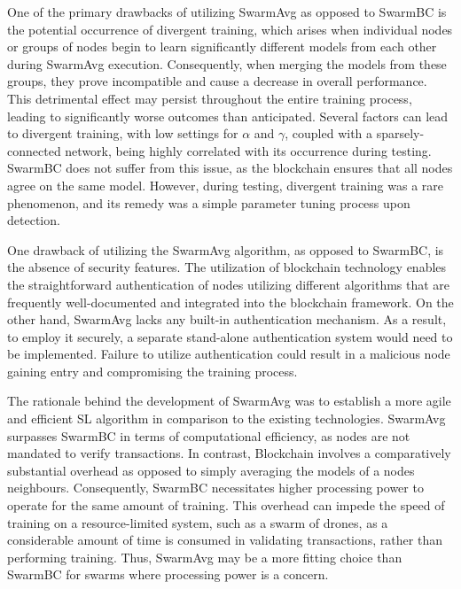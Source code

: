 One of the primary drawbacks of utilizing SwarmAvg as opposed to SwarmBC is the potential occurrence of divergent training, which arises when individual nodes or groups of nodes begin to learn significantly different models from each other during SwarmAvg execution. Consequently, when merging the models from these groups, they prove incompatible and cause a decrease in overall performance. This detrimental effect may persist throughout the entire training process, leading to significantly worse outcomes than anticipated. Several factors can lead to divergent training, with low settings for $\alpha$ and $\gamma$, coupled with a sparsely-connected network, being highly correlated with its occurrence during testing. SwarmBC does not suffer from this issue, as the blockchain ensures that all nodes agree on the same model. However, during testing, divergent training was a rare phenomenon, and its remedy was a simple parameter tuning process upon detection.

One drawback of utilizing the SwarmAvg algorithm, as opposed to SwarmBC, is the absence of security features. The utilization of blockchain technology enables the straightforward authentication of nodes utilizing different algorithms that are frequently well-documented and integrated into the blockchain framework. On the other hand, SwarmAvg lacks any built-in authentication mechanism. As a result, to employ it securely, a separate stand-alone authentication system would need to be implemented. Failure to utilize authentication could result in a malicious node gaining entry and compromising the training process.

The rationale behind the development of SwarmAvg was to establish a more agile and efficient SL algorithm in comparison to the existing technologies. SwarmAvg surpasses SwarmBC in terms of computational efficiency, as nodes are not mandated to verify transactions. In contrast, Blockchain involves a comparatively substantial overhead as opposed to simply averaging the models of a nodes neighbours. Consequently, SwarmBC necessitates higher processing power to operate for the same amount of training. This overhead can impede the speed of training on a resource-limited system, such as a swarm of drones, as a considerable amount of time is consumed in validating transactions, rather than performing training. Thus, SwarmAvg may be a more fitting choice than SwarmBC for swarms where processing power is a concern.



